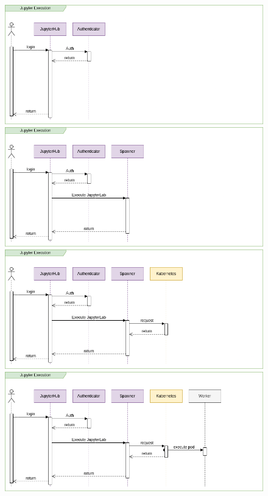 \documentclass[10pt,brazil]{beamer}
\theoremstyle{definition}
\begin{document}
\begin{frame}[plain]
\begin{figure}
\begin{center}
\begin{overprint}
          \includegraphics[width=1\textwidth]{seq-jupy-4.png}
          \includegraphics[width=1\textwidth]{seq-jupy-5.png}
          \includegraphics[width=1\textwidth]{seq-jupy-6.png}
          \includegraphics[width=1\textwidth]{seq-jupy-7.png}

\end{overprint}
\end{center}
\end{figure}
\end{frame}
\end{document}
